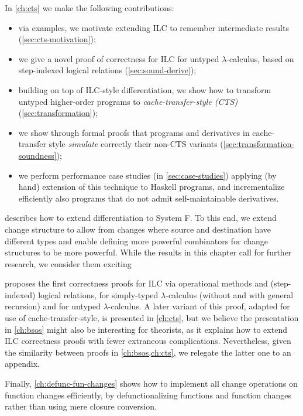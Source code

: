 In \cref{ch:cts} we make the following contributions:
\begin{itemize}
\item via examples, we motivate extending ILC to remember intermediate
  results (\cref{sec:cts-motivation});
\item we give a novel proof of correctness for ILC for untyped
  $\lambda$-calculus, based on step-indexed logical relations
  (\cref{sec:sound-derive});
\item building on top of ILC-style differentiation, we show how to transform
  untyped higher-order programs to \emph{cache-transfer-style (CTS)}
  (\cref{sec:transformation});
\item we show through formal proofs that programs and derivatives in cache-transfer style
  \emph{simulate} correctly their non-CTS variants (\cref{sec:transformation-soundness});
\item we perform performance case studies (in \cref{sec:case-studies}) applying
  (by hand) extension of this technique to Haskell programs, and incrementalize
  efficiently also programs that do not admit self-maintainable derivatives.
\end{itemize}

 describes how to extend differentiation to
System F. To this end, we extend change structure to allow from changes where
source and destination have different types and enable defining more powerful
combinators for change structures to be more powerful.
While the results in this chapter call for further research, we consider them
exciting

 proposes the first correctness proofs for ILC via operational
methods and (step-indexed) logical relations, for simply-typed $\lambda$-calculus
(without and with general recursion) and for untyped $\lambda$-calculus.
A later variant of this proof, adapted for use of cache-transfer-style, is
presented in \cref{ch:cts}, but we believe the presentation in \cref{ch:bsos}
might also be interesting for theorists, as it explains how to extend ILC
correctness proofs with fewer extraneous complications.
Nevertheless, given the similarity between proofs in \cref{ch:bsos,ch:cts}, we
relegate the latter one to an appendix.

Finally, \cref{ch:defunc-fun-changes} shows how to implement all change operations on
function changes efficiently, by defunctionalizing functions and
function changes rather than using mere closure conversion.
